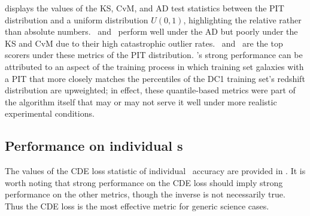  displays the values of the KS, CvM, and AD test statistics between the PIT distribution and a uniform distribution $U(0, 1)$, highlighting the relative rather than absolute numbers.
\metaphor\ and \lephare\ perform well under the AD but poorly under the KS and CvM due to their high catastrophic outlier rates.
\annz\ and \flexzboost\  are the top scorers under these metrics of the PIT distribution.
\annz's strong performance can be attributed to an aspect of the training process in which training set galaxies with a PIT that more closely matches the percentiles of the DC1 training set's redshift distribution are upweighted; in effect, these quantile-based metrics were part of the algorithm itself that may or may not serve it well under more realistic experimental conditions.

\subsection{Performance on individual \pzpdf s}

The values of the CDE loss statistic of individual \pzpdf\ accuracy are provided in .
It is worth noting that strong performance on the CDE loss should imply strong performance on the other metrics, though the inverse is not necessarily true.
Thus the CDE loss is the most effective metric for generic science cases.

